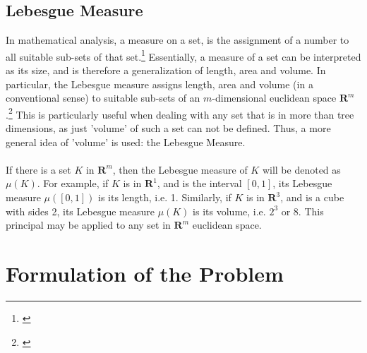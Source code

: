 \subsection{Lebesgue Measure} \label{measure}
In mathematical analysis, a measure on a set, is the assignment of a number to all suitable sub-sets of that set.\footnote{\cite{cortzen_weisstein}} Essentially, a measure of a set can be interpreted as its size, and is therefore a generalization of length, area and volume. In particular, the Lebesgue measure assigns length, area and volume (in a conventional sense) to suitable sub-sets of an $m$-dimensional euclidean space $\boldsymbol{R}^m$.\footnote{\cite{lebesgue_1902}} This is particularly useful when dealing with any set that is in more than tree dimensions, as just 'volume' of such a set can not be defined. Thus, a more general idea of 'volume' is used: the Lebesgue Measure.\\
\\
If there is a set $K$ in $\boldsymbol{R}^m$, then the Lebesgue measure of $K$ will be denoted as $\mu(K)$. For example, if $K$ is in $\boldsymbol{R}^1$, and is the interval $[0,1]$, its Lebesgue measure $\mu([0,1])$ is its length, i.e. 1. Similarly, if $K$ is in $\boldsymbol{R}^3$, and is a cube with sides 2, its Lebesgue measure $\mu(K)$ is its volume, i.e. $2^3$ or 8. This principal may be applied to any set in $\boldsymbol{R}^m$ euclidean space.

\section{Formulation of the Problem}

